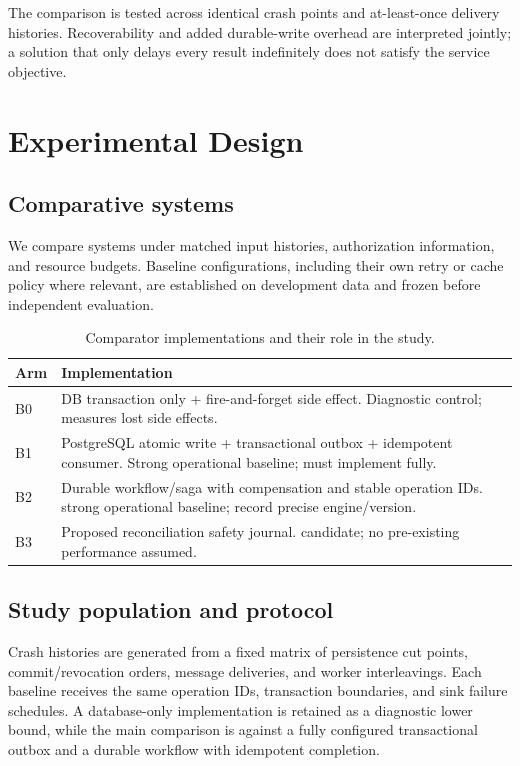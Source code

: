 \documentclass[11pt,a4paper]{article}
\begin{document}
The comparison is tested across identical crash points and at-least-once delivery histories. Recoverability and added durable-write overhead are interpreted jointly; a solution that only delays every result indefinitely does not satisfy the service objective.

\section{Experimental Design}
\subsection{Comparative systems}
We compare systems under matched input histories, authorization information, and resource budgets. Baseline configurations, including their own retry or cache policy where relevant, are established on development data and frozen before independent evaluation.
\begin{table}[ht]
\centering\footnotesize
\caption{Comparator implementations and their role in the study.}
\begin{tabularx}{\linewidth}{@{}lX@{}}\toprule
Arm & Implementation \\ \midrule
B0 & DB transaction only + fire-and-forget side effect. Diagnostic control; measures lost side effects. \\ 
B1 & PostgreSQL atomic write + transactional outbox + idempotent consumer. Strong operational baseline; must implement fully. \\ 
B2 & Durable workflow/saga with compensation and stable operation IDs. strong operational baseline; record precise engine/version. \\ 
B3 & Proposed reconciliation safety journal. candidate; no pre-existing performance assumed. \\ 
\bottomrule\end{tabularx}
\end{table}

\subsection{Study population and protocol}
Crash histories are generated from a fixed matrix of persistence cut points, commit/revocation orders, message deliveries, and worker interleavings. Each baseline receives the same operation IDs, transaction boundaries, and sink failure schedules. A database-only implementation is retained as a diagnostic lower bound, while the main comparison is against a fully configured transactional outbox and a durable workflow with idempotent completion.
\end{document}
